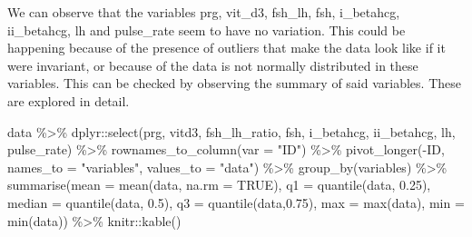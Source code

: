 \documentclass[
]{article}
\newenvironment{Shaded}{\begin{snugshade}}{\end{snugshade}}
\newcommand{\AttributeTok}[1]{\textcolor[rgb]{0.77,0.63,0.00}{#1}}
\newcommand{\ConstantTok}[1]{\textcolor[rgb]{0.00,0.00,0.00}{#1}}
\newcommand{\FloatTok}[1]{\textcolor[rgb]{0.00,0.00,0.81}{#1}}
\newcommand{\FunctionTok}[1]{\textcolor[rgb]{0.00,0.00,0.00}{#1}}
\newcommand{\NormalTok}[1]{#1}
\newcommand{\SpecialCharTok}[1]{\textcolor[rgb]{0.00,0.00,0.00}{#1}}
\newcommand{\StringTok}[1]{\textcolor[rgb]{0.31,0.60,0.02}{#1}}
\begin{document}
We can observe that the variables prg, vit\_d3, fsh\_lh, fsh,
i\_betahcg, ii\_betahcg, lh and pulse\_rate seem to have no variation.
This could be happening because of the presence of outliers that make
the data look like if it were invariant, or because of the data is not
normally distributed in these variables. This can be checked by
observing the summary of said variables. These are explored in detail.

\begin{Shaded}
\begin{Highlighting}[]
\NormalTok{data }\SpecialCharTok{\%\textgreater{}\%}
\NormalTok{  dplyr}\SpecialCharTok{::}\FunctionTok{select}\NormalTok{(prg, vitd3, fsh\_lh\_ratio, fsh, i\_betahcg, ii\_betahcg, lh, pulse\_rate) }\SpecialCharTok{\%\textgreater{}\%} 
  \FunctionTok{rownames\_to\_column}\NormalTok{(}\AttributeTok{var =} \StringTok{"ID"}\NormalTok{) }\SpecialCharTok{\%\textgreater{}\%} 
  \FunctionTok{pivot\_longer}\NormalTok{(}\SpecialCharTok{{-}}\NormalTok{ID, }\AttributeTok{names\_to =} \StringTok{"variables"}\NormalTok{, }\AttributeTok{values\_to =} \StringTok{"data"}\NormalTok{) }\SpecialCharTok{\%\textgreater{}\%} 
  \FunctionTok{group\_by}\NormalTok{(variables) }\SpecialCharTok{\%\textgreater{}\%} 
  \FunctionTok{summarise}\NormalTok{(}\AttributeTok{mean =} \FunctionTok{mean}\NormalTok{(data, }\AttributeTok{na.rm =} \ConstantTok{TRUE}\NormalTok{),}
            \AttributeTok{q1 =} \FunctionTok{quantile}\NormalTok{(data, }\FloatTok{0.25}\NormalTok{),}
            \AttributeTok{median =} \FunctionTok{quantile}\NormalTok{(data, }\FloatTok{0.5}\NormalTok{),}
            \AttributeTok{q3 =} \FunctionTok{quantile}\NormalTok{(data,}\FloatTok{0.75}\NormalTok{),}
            \AttributeTok{max =} \FunctionTok{max}\NormalTok{(data), }
            \AttributeTok{min =} \FunctionTok{min}\NormalTok{(data)) }\SpecialCharTok{\%\textgreater{}\%} 
\NormalTok{  knitr}\SpecialCharTok{::}\FunctionTok{kable}\NormalTok{()}
\end{Highlighting}
\end{Shaded}
\end{document}
